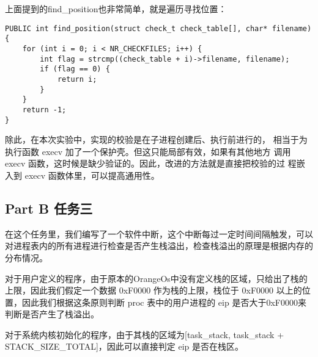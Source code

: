 \documentclass{whureport}
\begin{document}
上面提到的find\_position也非常简单，就是遍历寻找位置：
\begin{lstlisting}
PUBLIC int find_position(struct check_t check_table[], char* filename) {
    for (int i = 0; i < NR_CHECKFILES; i++) {
        int flag = strcmp((check_table + i)->filename, filename);
        if (flag == 0) {
            return i;
        }
    }
    return -1;
}
\end{lstlisting}

除此，在本次实验中，实现的校验是在子进程创建后、执行前进行的， 相当于为执行函数 execv 加了一个保护壳。但这只能局部有效，如果有其他地方 调用 execv 函数，这时候是缺少验证的。因此，改进的方法就是直接把校验的过 程嵌入到 execv 函数体里，可以提高通用性。


\subsection{Part B 任务三}

在这个任务里，我们编写了一个软件中断，这个中断每过一定时间间隔触发，可以对进程表内的所有进程进行检查是否产生栈溢出，检查栈溢出的原理是根据内存的分布情况。

对于用户定义的程序，由于原本的OrangeOs中没有定义栈的区域，只给出了栈的上限，因此我们假定一个数据 0xF0000 作为栈的上限，栈位于 0xF0000 以上的位置，因此我们根据这条原则判断 proc 表中的用户进程的 eip 是否大于0xF0000来判断是否产生了栈溢出。

对于系统内核初始化的程序，由于其栈的区域为[task\_stack, task\_stack + STACK\_SIZE\_TOTAL]，因此可以直接判定 eip 是否在栈区。
\end{document}
